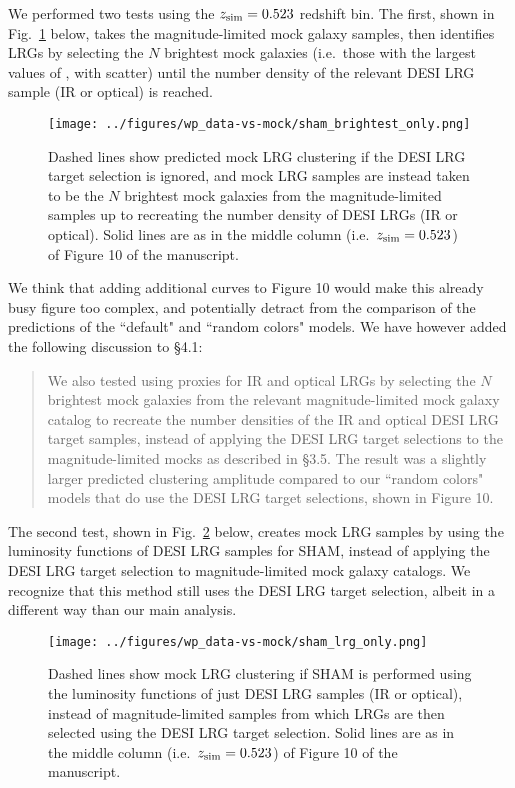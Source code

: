 \documentclass[11pt,preprint]{aastex}
\begin{document}
We performed two tests using the $z_{\rm sim}=0.523$ redshift bin. The first, shown in Fig.~\ref{fig:test1} below, takes the magnitude-limited mock galaxy samples, then identifies LRGs by selecting the $N$ brightest mock galaxies (i.e.\ those with the largest values of \vpeak, with scatter) until the number density of the relevant DESI LRG sample (IR or optical) is reached.
\begin{figure}[h!]
\centering
  \texttt{[image: ../figures/wp\_data-vs-mock/sham\_brightest\_only.png]}
  \caption{Dashed lines show predicted mock LRG clustering if the DESI LRG target selection is ignored, and mock LRG samples are instead taken to be the $N$ brightest mock galaxies from the magnitude-limited samples up to recreating the number density of DESI LRGs (IR or optical). Solid lines are as in the middle column (i.e.\ $z_{\rm sim}=0.523$) of Figure 10 of the manuscript.
  \label{fig:test1}
  }
\end{figure}

We think that adding additional curves to Figure 10 would make this already busy figure too complex, and potentially detract from the comparison of the predictions of the ``default" and ``random colors" models. We have however added the following discussion to \S4.1:
\begin{quotation}
We also tested using proxies for IR and optical LRGs by selecting the $N$ brightest mock galaxies from the relevant magnitude-limited mock galaxy catalog to recreate the number densities of the IR and optical DESI LRG target samples, instead of applying the DESI LRG target selections to the magnitude-limited mocks as described in \S3.5. The result was a slightly larger predicted clustering amplitude compared to our ``random colors" models that do use the DESI LRG target selections, shown in Figure 10.
\end{quotation}

The second test, shown in Fig.~\ref{fig:test2} below, creates mock LRG samples by using the luminosity functions of DESI LRG samples for SHAM, instead of applying the DESI LRG target selection to magnitude-limited mock galaxy catalogs. We recognize that this method still uses the DESI LRG target selection, albeit in a different way than our main analysis.
\begin{figure}[h!]
\centering
  \texttt{[image: ../figures/wp\_data-vs-mock/sham\_lrg\_only.png]}
  \caption{Dashed lines show mock LRG clustering if SHAM is performed using the luminosity functions of just DESI LRG samples (IR or optical), instead of magnitude-limited samples from which LRGs are then selected using the DESI LRG target selection. Solid lines are as in the middle column (i.e.\ $z_{\rm sim}=0.523$) of Figure 10 of the manuscript.
  \label{fig:test2}
  }
\end{figure}
\end{document}
